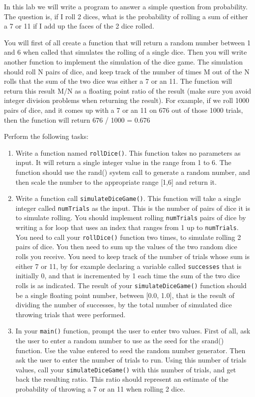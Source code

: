 \documentclass[11pt]{article}
\begin{document}
In this lab we will write a program to answer a simple question from
probability.  The question is, if I roll 2 dices, what is the probability
of rolling a sum of either a 7 or 11 if I add up the faces of the 2 dice
rolled.

You will first of all create a function that will return a random
number between 1 and 6 when called that simulates the rolling of a
single dice.  Then you will write another function to implement the
simulation of the dice game.  The simulation should roll N pairs of
dice, and keep track of the number of times M out of the N rolls that
the sum of the two dice was either a 7 or an 11.  The function will
return this result M/N as a floating point ratio of the result (make
sure you avoid integer division problems when returning the result).
For example, if we roll 1000 pairs of dice, and it comes up with a 7
or an 11 on 676 out of those 1000 trials, then the function will
return 676 / 1000 = 0.676


Perform the following tasks:

\begin{enumerate}
\item Write a function named \verb~rollDice()~.  This function takes no
   parameters as input.  It will return a single integer value in the
   range from 1 to 6.  The function should use the rand()
   system call to generate a random number, and then scale the
   number to the appropriate range [1,6] and return it.
\item Write a function call \verb~simulateDiceGame()~.  This function will
   take a single integer called \verb~numTrials~ as the input.  This is the
   number of pairs of dice it is to simulate rolling.  You should
   implement rolling \verb~numTrials~ pairs of dice by writing a for loop
   that uses an index that ranges from 1 up to \verb~numTrials~.  You need
   to call your \verb~rollDice()~ function two times, to simulate rolling 2
   pairs of dice.  You then need to sum up the values of the two
   random dice rolls you receive.  You need to keep track of the
   number of trials whose sum is either 7 or 11, by for example
   declaring a variable called \verb~successes~ that is initially 0, and
   that is incremented by 1 each time the sum of the two dice rolls is
   as indicated.  The result of your \verb~simulateDiceGame()~ function should
   be a single floating point number, between [0.0, 1.0], that is the
   result of dividing the number of successes, by the total number of
   simulated dice throwing trials that were performed.
\item In your \verb~main()~ function, prompt the user to enter two values.
   First of all, ask the user to enter a random number to use as the
   seed for the srand() function.  Use the value entered to seed the
   random number generator.  Then ask the user to enter the number of
   trials to run. Using this number of trials values, call your
   \verb~simulateDiceGame()~ with this number of trials, and get back the
   resulting ratio.  This ratio should represent an estimate of the
   probability of throwing a 7 or an 11 when rolling 2 dice.
\end{enumerate}
\end{document}
